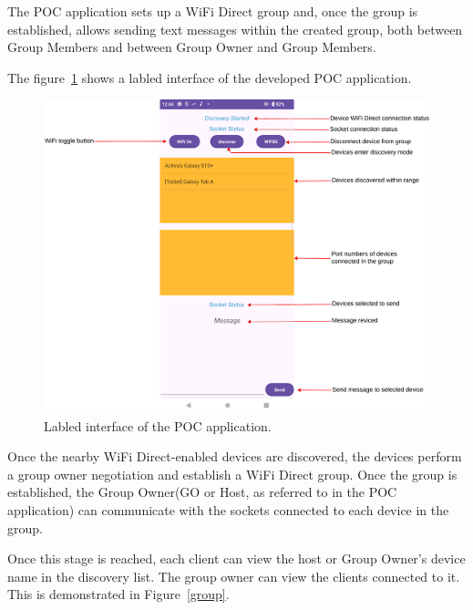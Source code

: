 The POC application sets up a WiFi Direct group and, once the group is
established, allows sending text messages within the created group, both
between Group Members and between Group Owner and Group Members.

The figure~\ref{labelewifidipoc} shows a labled interface of the developed POC
application.

\begin{figure}[htbp]

    \centerline{\includegraphics[height=0.9\textwidth]{imgs/labledwifidipoc.png}}
    \caption{Labled interface of the POC application.}
    \label{labelewifidipoc}
\end{figure}

Once the nearby WiFi Direct-enabled devices are discovered, the devices perform
a group owner negotiation and establish a WiFi Direct group. Once the group is
established, the Group Owner(GO or Host, as referred to in the POC application)
can communicate with the sockets connected to each device in the group.

Once this stage is reached, each client can view the host or Group Owner's
device name in the discovery list. The group owner can view the clients
connected to it. This is demonstrated in Figure~\ref{group}.

